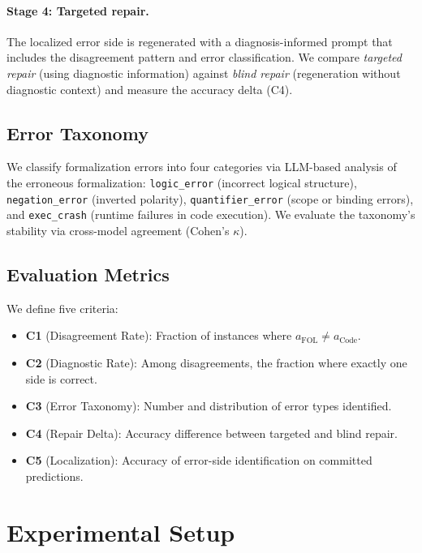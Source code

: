 \documentclass[11pt]{article}
\begin{document}
\paragraph{Stage 4: Targeted repair.} The localized error side is regenerated with a diagnosis-informed prompt that includes the disagreement pattern and error classification. We compare \emph{targeted repair} (using diagnostic information) against \emph{blind repair} (regeneration without diagnostic context) and measure the accuracy delta (C4).

\subsection{Error Taxonomy}

We classify formalization errors into four categories via LLM-based analysis of the erroneous formalization: \texttt{logic\_error} (incorrect logical structure), \texttt{negation\_error} (inverted polarity), \texttt{quantifier\_error} (scope or binding errors), and \texttt{exec\_crash} (runtime failures in code execution). We evaluate the taxonomy's stability via cross-model agreement (Cohen's $\kappa$).

\subsection{Evaluation Metrics}

We define five criteria:
\begin{itemize}
    \item \textbf{C1} (Disagreement Rate): Fraction of instances where $a_{\text{FOL}} \neq a_{\text{Code}}$.
    \item \textbf{C2} (Diagnostic Rate): Among disagreements, the fraction where exactly one side is correct.
    \item \textbf{C3} (Error Taxonomy): Number and distribution of error types identified.
    \item \textbf{C4} (Repair Delta): Accuracy difference between targeted and blind repair.
    \item \textbf{C5} (Localization): Accuracy of error-side identification on committed predictions.
\end{itemize}

\section{Experimental Setup}
\end{document}
